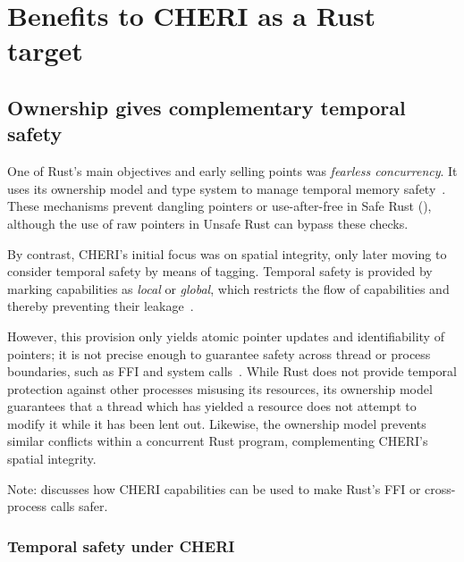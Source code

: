 \documentclass[dissertation.tex]{subfiles}
\begin{document}
\section{Benefits to CHERI as a Rust target}
\label{sec:eval-cheri}

\subsection{Ownership gives complementary temporal safety}
\label{sec:eval-cheri-spatial-temporal}


One of Rust's main objectives and early selling points was
\emph{fearless concurrency}.
It uses its ownership model and type system to manage temporal memory
safety~\cite{rust-trpl-book}.
These mechanisms prevent dangling pointers or use-after-free in Safe
Rust (), although the use of raw pointers in
Unsafe Rust can bypass these checks.

By contrast, CHERI's initial focus was on spatial integrity, only later
moving to consider temporal safety by means of tagging.
Temporal safety is provided by marking capabilities as \emph{local} or
\emph{global}, which restricts the flow of capabilities and thereby
preventing their leakage~\cite{cheri2015}.

However, this provision only yields atomic pointer updates and
identifiability of pointers;
it is not precise enough to guarantee safety across thread or process
boundaries, such as FFI and system calls~\cite{cheri-2019-abstract}.
While Rust does not provide temporal protection against other processes
misusing its resources, its ownership model guarantees that a thread
which has yielded a resource does not attempt to modify it while it has
been lent out.
Likewise, the ownership model prevents similar conflicts within a
concurrent Rust program, complementing CHERI's spatial integrity.

Note:  discusses how CHERI capabilities can
be used to make Rust's FFI or cross-process calls safer.

\subsubsection{Temporal safety under CHERI}
\end{document}
